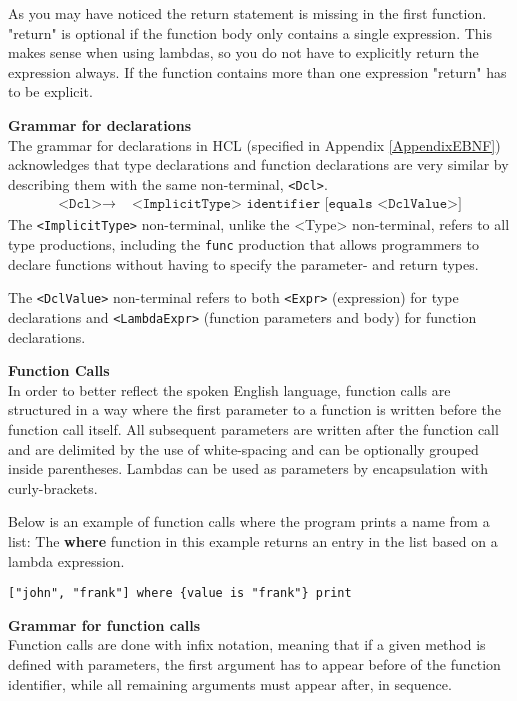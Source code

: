 As you may have noticed the return statement is missing in the first function. "return" is optional if the function body only contains a single expression. This makes sense when using lambdas, so you do not have to explicitly return the expression always. If the function contains more than one expression "return" has to be explicit.


\textbf{Grammar for declarations}\\
The grammar for declarations in HCL (specified in Appendix \ref{AppendixEBNF}) acknowledges that type declarations and function declarations are very similar by describing them with the same non-terminal, \texttt{<Dcl>}.
\begin{align*}
	\texttt{<Dcl>}\to & \texttt{ <ImplicitType> identifier [equals <DclValue>]}
\end{align*}
The \texttt{<ImplicitType>} non-terminal, unlike the <Type> non-terminal, refers to all type productions, including the \texttt{func} production that allows programmers to declare functions without having to specify the parameter- and return types.

The \texttt{<DclValue>} non-terminal refers to both \texttt{<Expr>} (expression) for type declarations and \texttt{<LambdaExpr>} (function parameters and body) for function declarations.

\textbf{Function Calls}\\
In order to better reflect the spoken English language, function calls are structured in a way where the first parameter to a function is written before the function call itself.
All subsequent parameters are written after the function call and are delimited by the use of white-spacing and can be optionally grouped inside parentheses.
Lambdas can be used as parameters by encapsulation with curly-brackets. 

Below is an example of function calls where the program prints a name from a list:
The \textbf{where} function in this example returns an entry in the list based on a lambda expression.
\begin{lstlisting}
["john", "frank"] where {value is "frank"} print
\end{lstlisting}

\textbf{Grammar for function calls}\\
Function calls are done with infix notation, meaning that if a given method is defined with parameters, the first argument has to appear before of the function identifier, while all remaining arguments must appear after, in sequence.

